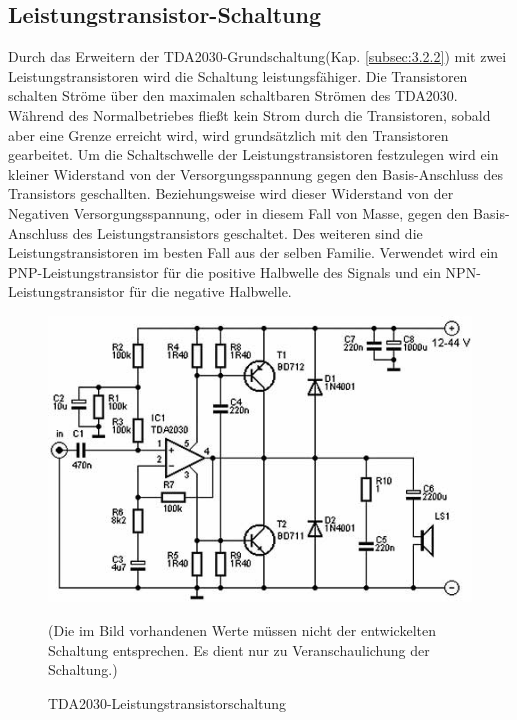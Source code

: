 \subsection{Leistungstransistor-Schaltung}\label{subsec:3.2.3}
Durch das Erweitern der TDA2030-Grundschaltung(Kap. \ref{subsec:3.2.2}) mit zwei Leistungstransistoren wird die Schaltung leistungsfähiger. Die Transistoren schalten Ströme über den maximalen schaltbaren Strömen des TDA2030. Während des Normalbetriebes fließt kein Strom durch die Transistoren, sobald aber eine Grenze erreicht wird, wird grundsätzlich mit den Transistoren gearbeitet. Um die Schaltschwelle der Leistungstransistoren festzulegen wird ein kleiner Widerstand von der Versorgungsspannung gegen den Basis-Anschluss des Transistors geschallten. Beziehungsweise wird dieser Widerstand von der Negativen Versorgungsspannung, oder in diesem Fall von Masse, gegen den Basis-Anschluss des Leistungstransistors geschaltet.
Des weiteren sind die Leistungstransistoren im besten Fall aus der selben Familie. Verwendet wird ein PNP-Leistungstransistor für die positive Halbwelle des Signals und ein NPN-Leistungstransistor für die negative Halbwelle.
\begin{figure} [H]
	\centering
	\includegraphics[width=1\textwidth]{img/Grundlagen/TDA2030/TDA2030-Leistungstransschaltung.jpg}
	\caption[TDA2030-Leistungstransistorschaltung]{TDA2030-Leistungstransistorschaltung\footnotemark}
	\text (Die im Bild vorhandenen Werte müssen nicht der entwickelten Schaltung entsprechen. Es dient nur zu Veranschaulichung der Schaltung.)
	\label {fig:3.2.3.1}
\end{figure}

